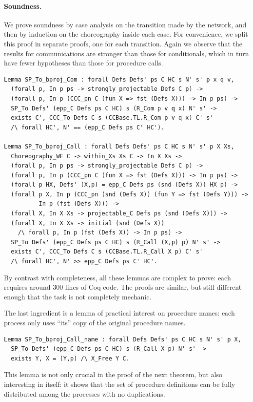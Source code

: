 \documentclass[runningheads]{llncs}
\begin{document}
\paragraph{Soundness.}
We prove soundness by case analysis on the transition made by the network, and
then by induction on the choreography inside each case.
For convenience, we split this proof in separate proofs, one for each transition.
Again we observe that the results for communications are stronger than those for conditionals, which
in turn have fewer hypotheses than those for procedure calls.
\begin{lstlisting}
Lemma SP_To_bproj_Com : forall Defs Defs' ps C HC s N' s' p x q v,
  (forall p, In p ps -> strongly_projectable Defs C p) ->
  (forall p, In p (CCC_pn C (fun X => fst (Defs X))) -> In p ps) ->
  SP_To Defs' (epp_C Defs ps C HC) s (R_Com p v q x) N' s' ->
  exists C', CCC_To Defs C s (CCBase.TL.R_Com p v q x) C' s'
  /\ forall HC', N' == (epp_C Defs ps C' HC').

Lemma SP_To_bproj_Call : forall Defs Defs' ps C HC s N' s' p X Xs,
  Choreography_WF C -> within_Xs Xs C -> In X Xs ->
  (forall p, In p ps -> strongly_projectable Defs C p) ->
  (forall p, In p (CCC_pn C (fun X => fst (Defs X))) -> In p ps) ->
  (forall p HX, Defs' (X,p) = epp_C Defs ps (snd (Defs X)) HX p) ->
  (forall p X, In p (CCC_pn (snd (Defs X)) (fun Y => fst (Defs Y))) ->
          In p (fst (Defs X))) ->
  (forall X, In X Xs -> projectable_C Defs ps (snd (Defs X))) ->
  (forall X, In X Xs -> initial (snd (Defs X))
    /\ forall p, In p (fst (Defs X)) -> In p ps) ->
  SP_To Defs' (epp_C Defs ps C HC) s (R_Call (X,p) p) N' s' ->
  exists C', CCC_To Defs C s (CCBase.TL.R_Call X p) C' s'
  /\ forall HC', N' >> epp_C Defs ps C' HC'.
\end{lstlisting}
By contrast with completeness, all these lemmas are complex to prove: each requires around
300 lines of Coq code.
The proofs are similar,
but still different enough that the
task is not completely mechanic.

The last ingredient is a lemma of practical interest on procedure names: each process only uses ``its'' copy of the original procedure names.
\begin{lstlisting}
Lemma SP_To_bproj_Call_name : forall Defs Defs' ps C HC s N' s' p X,
  SP_To Defs' (epp_C Defs ps C HC) s (R_Call X p) N' s' ->
  exists Y, X = (Y,p) /\ X_Free Y C.
\end{lstlisting}
This lemma is not only crucial in the proof of the next theorem, but also interesting in itself: it
shows that the set of procedure definitions can be fully distributed among the processes with no
duplications.
\end{document}
